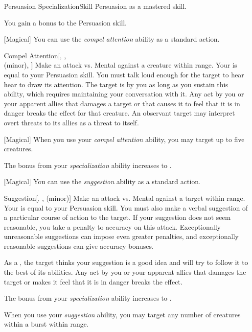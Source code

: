     \begin{feat}{Persuasion Specialization}{Skill}
        \featpre Persuasion as a mastered skill.

         You gain a  bonus to the Persuasion skill.

        [Magical] You can use the \textit{compel attention} ability as a standard action.
        \begin{apability}{Compel Attention}[, ,\\ (minor), ]
            Make an attack vs. Mental against a creature within \rngmed range.
            Your  is equal to your Persuasion skill.
            You must talk loud enough for the target to hear hear to draw its attention.
            \hit The target is  by you as long as you sustain this ability, which requires maintaining your conversation with it.
            Any act by you or your apparent allies that damages a target or that causes it to feel that it is in danger breaks the effect for that creature.
            An observant target may interpret overt threats to its allies as a threat to itself.
        \end{apability}

        [Magical] When you use your \textit{compel attention} ability, you may target up to five creatures.

         The bonus from your \textit{specialization} ability increases to .

        [Magical] You can use the \textit{suggestion} ability as a standard action.
        \begin{apability}{Suggestion}[, ,  (minor)]
            Make an attack vs. Mental against a target within \rngmed range.
            Your  is equal to your Persuasion skill.
            You must also make a verbal suggestion of a particular course of action to the target.
            If your suggestion does not seem reasonable, you take a  penalty to accuracy on this attack.
            Exceptionally unreasonable suggestions can impose even greater penalties, and exceptionally reasonable suggestions can give accuracy bonuses.

            \hit As a , the target thinks your suggestion is a good idea and will try to follow it to the best of its abilities.
            Any act by you or your apparent allies that damages the target or makes it feel that it is in danger breaks the effect.

        \end{apability}

         The bonus from your \textit{specialization} ability increases to .

         When you use your \textit{suggestion} ability, you may target any number of creatures within a \areamed burst within range.
    \end{feat}


